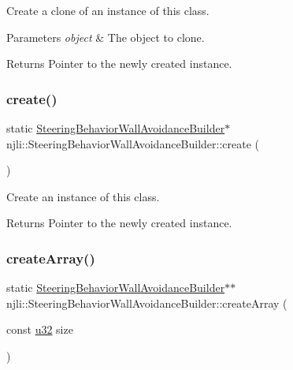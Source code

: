 Create a clone of an instance of this class.


\begin{DoxyParams}{Parameters}
{\em object} & The object to clone.\\
\hline
\end{DoxyParams}
\begin{DoxyReturn}{Returns}
Pointer to the newly created instance. 
\end{DoxyReturn}
\mbox{\label{classnjli_1_1_steering_behavior_wall_avoidance_builder_af4e1862c16f0f5fd4023554874861517}} 
\subsubsection{\texorpdfstring{create()}{create()}}
{\footnotesize\ttfamily static \mbox{\hyperlink{classnjli_1_1_steering_behavior_wall_avoidance_builder}{Steering\+Behavior\+Wall\+Avoidance\+Builder}}$\ast$ njli\+::\+Steering\+Behavior\+Wall\+Avoidance\+Builder\+::create (\begin{DoxyParamCaption}{ }\end{DoxyParamCaption})\hspace{0.3cm}{\ttfamily [static]}}

Create an instance of this class.

\begin{DoxyReturn}{Returns}
Pointer to the newly created instance. 
\end{DoxyReturn}
\mbox{\label{classnjli_1_1_steering_behavior_wall_avoidance_builder_a8bbb6ee79f62ba5abaadc712668ccccc}} 
\subsubsection{\texorpdfstring{create\+Array()}{createArray()}}
{\footnotesize\ttfamily static \mbox{\hyperlink{classnjli_1_1_steering_behavior_wall_avoidance_builder}{Steering\+Behavior\+Wall\+Avoidance\+Builder}}$\ast$$\ast$ njli\+::\+Steering\+Behavior\+Wall\+Avoidance\+Builder\+::create\+Array (\begin{DoxyParamCaption}\item[{const \mbox{\hyperlink{_util_8h_a10e94b422ef0c20dcdec20d31a1f5049}{u32}}}]{size }\end{DoxyParamCaption})\hspace{0.3cm}{\ttfamily [static]}}

